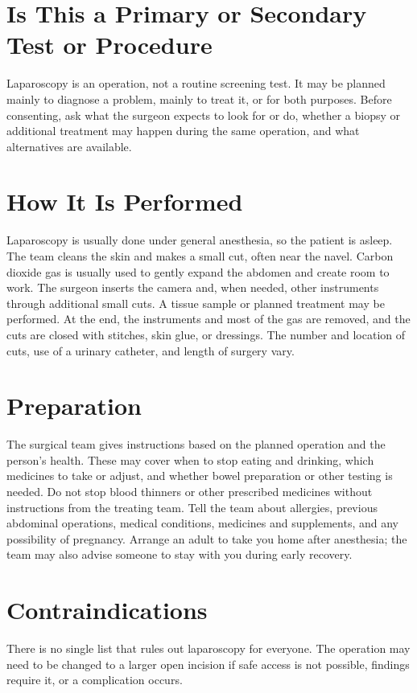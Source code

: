 \section*{Is This a Primary or Secondary Test or Procedure}
Laparoscopy is an operation, not a routine screening test. It may be planned mainly to diagnose a problem, mainly to treat it, or for both purposes. Before consenting, ask what the surgeon expects to look for or do, whether a biopsy or additional treatment may happen during the same operation, and what alternatives are available.

\section*{How It Is Performed}
Laparoscopy is usually done under general anesthesia, so the patient is asleep. The team cleans the skin and makes a small cut, often near the navel. Carbon dioxide gas is usually used to gently expand the abdomen and create room to work. The surgeon inserts the camera and, when needed, other instruments through additional small cuts. A tissue sample or planned treatment may be performed. At the end, the instruments and most of the gas are removed, and the cuts are closed with stitches, skin glue, or dressings. The number and location of cuts, use of a urinary catheter, and length of surgery vary.

\section*{Preparation}
The surgical team gives instructions based on the planned operation and the person's health. These may cover when to stop eating and drinking, which medicines to take or adjust, and whether bowel preparation or other testing is needed. Do not stop blood thinners or other prescribed medicines without instructions from the treating team. Tell the team about allergies, previous abdominal operations, medical conditions, medicines and supplements, and any possibility of pregnancy. Arrange an adult to take you home after anesthesia; the team may also advise someone to stay with you during early recovery.

\section*{Contraindications}
There is no single list that rules out laparoscopy for everyone. The operation may need to be changed to a larger open incision if safe access is not possible, findings require it, or a complication occurs.

